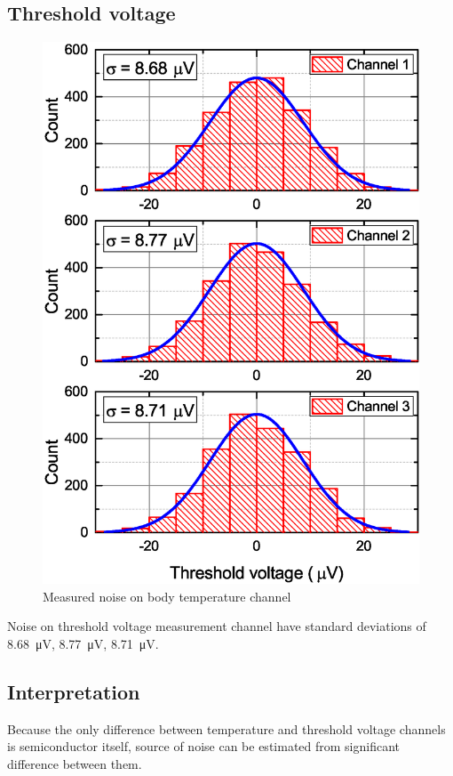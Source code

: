     \subsection{Threshold voltage}
        \begin{figure}[H]
            \centering
            \includegraphics[width=0.6\paperwidth]{img/07/thresholdVoltageHistograms.eps}
            \caption{Measured noise on body temperature channel}
        \end{figure}

        Noise on threshold voltage measurement channel have standard deviations of \SI{8.68}{\uV}, \SI{8.77}{\uV}, \SI{8.71}{\uV}.



    \subsection{Interpretation}
        Because the only difference between temperature and threshold voltage channels is semiconductor itself, source of noise can be estimated from significant difference between them.

